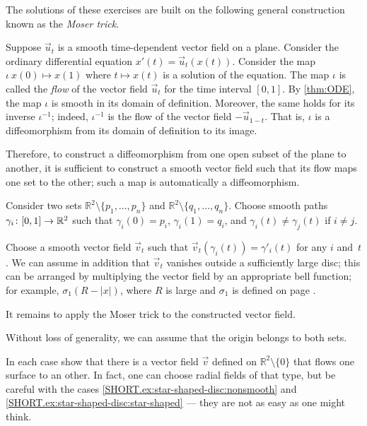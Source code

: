 \begin{multicols}{2}
The solutions of these exercises are built on the following general construction known as the \emph{Moser trick}.

Suppose $\vec u_t$ is a smooth time-dependent vector field on a plane.
Consider the ordinary differential equation $x'(t)=\vec u_t(x(t))$.
Consider the map $\iota\:x(0)\mapsto x(1)$ where $t\mapsto x(t)$ is a solution of the equation.
The map $\iota$ is called the \emph{flow} of the vector field $\vec u_t$ for the time interval $[0,1]$.
By \ref{thm:ODE}, the map $\iota$ is smooth in its domain of definition.
Moreover, the same holds for its inverse $\iota^{-1}$;
indeed, $\iota^{-1}$ is the flow of the vector field $-\vec u_{1-t}$.
That is, $\iota$ is a diffeomorphism from its domain of definition to its image. 


Therefore, to construct a diffeomorphism from one open subset of the plane to another, it is sufficient to construct a smooth vector field such that its flow maps one set to the other;
such a map is automatically a diffeomorphism.


Consider two sets $\mathbb{R}^2\setminus\{p_1,\dots,p_n\}$ and $\mathbb{R}^2\setminus\{q_1,\dots,q_n\}$.
Choose smooth paths $\gamma_i\:[0,1]\z\to \mathbb{R}^2$ such that $\gamma_i(0)=p_i$,
$\gamma_i(1)=q_i$, and $\gamma_i(t)\ne \gamma_j(t)$ if $i\ne j$.

Choose a smooth vector field $\vec v_t$ such that $\vec v_t(\gamma_i(t))=\gamma'_i(t)$ for any $i$ and~$t$.
We can assume in addition that $\vec v_t$ vanishes outside a sufficiently large disc; this can be arranged by multiplying the vector field by an appropriate bell function;
for example, $\sigma_1(R-|x|)$, where $R$ is large and $\sigma_1$ is defined on page \pageref{page:sigma-function}.

It remains to apply the Moser trick to the constructed vector field. 

Without loss of generality, we can assume that the origin belongs to both sets.

In each case show that there is a vector field $\vec v$ defined on $\mathbb{R}^2\setminus\{0\}$ that flows one surface to an other.
In fact, one can choose radial fields of that type,
but be careful with the cases \ref{SHORT.ex:star-shaped-disc:nonsmooth} and \ref{SHORT.ex:star-shaped-disc:star-shaped} --- they are not as easy as one might think.


\end{multicols}
